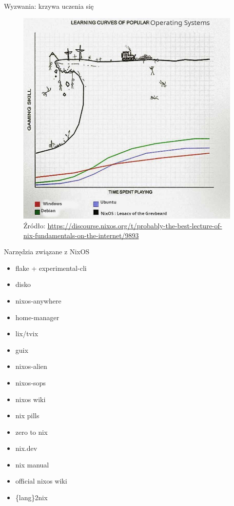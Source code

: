 \documentclass{beamer}
\begin{document}
\begin{frame}{Wyzwania: krzywa uczenia się}
    \begin{figure}
        \includegraphics[width=0.75\linewidth, height=0.75\textheight]{./assets/nixoscurve.jpg}
        \caption*{\scriptsize Źródło: \url{https://discourse.nixos.org/t/probably-the-best-lecture-of-nix-fundamentals-on-the-internet/9893}} %
    \end{figure}
\end{frame}

\begin{frame}{Narzędzia związane z NixOS}
    \begin{itemize}
        \item flake + experimental-cli
        \item disko
        \item nixos-anywhere
        \item home-manager
        \item lix/tvix
        \item guix
        \item nixos-alien
        \item nixos-sops
        \item nixos wiki
        \item nix pills
        \item zero to nix
        \item nix.dev
        \item nix manual
        \item official nixos wiki
        \item \{lang\}2nix
    \end{itemize}
\end{frame}
\end{document}
